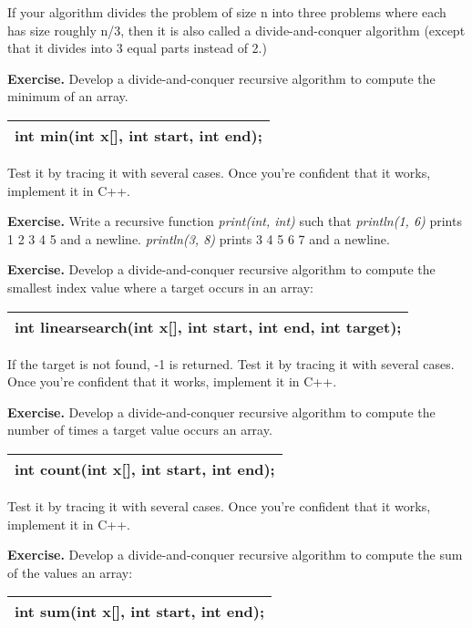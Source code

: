\documentclass[
]{article}
\begin{document}
If your algorithm divides the problem of size n into three problems
where each has size roughly n/3, then it is also called a
divide-and-conquer algorithm (except that it divides into 3 equal parts
instead of 2.)

\textbf{Exercise.} Develop a divide-and-conquer recursive algorithm to
compute the minimum of an array.

\begin{longtable}[]{@{}l@{}}
\toprule
\endhead
int min(int x{[}{]}, int start, int end);\tabularnewline
\bottomrule
\end{longtable}

Test it by tracing it with several cases. Once you're confident that it
works, implement it in C++.

\textbf{Exercise.} Write a recursive function \emph{print(int, int)}
such that \emph{println(1, 6)} prints 1 2 3 4 5 and a newline.
\emph{println(3, 8) }prints 3 4 5 6 7 and a newline.

\textbf{Exercise.} Develop a divide-and-conquer recursive algorithm to
compute the smallest index value where a target occurs in an array:

\begin{longtable}[]{@{}l@{}}
\toprule
\endhead
int linearsearch(int x{[}{]}, int start, int end, int
target);\tabularnewline
\bottomrule
\end{longtable}

If the target is not found, -1 is returned. Test it by tracing it with
several cases. Once you're confident that it works, implement it in C++.

\textbf{Exercise.} Develop a divide-and-conquer recursive algorithm to
compute the number of times a target value occurs an array.

\begin{longtable}[]{@{}l@{}}
\toprule
\endhead
int count(int x{[}{]}, int start, int end);\tabularnewline
\bottomrule
\end{longtable}

Test it by tracing it with several cases. Once you're confident that it
works, implement it in C++.

\textbf{Exercise.} Develop a divide-and-conquer recursive algorithm to
compute the sum of the values an array:

\begin{longtable}[]{@{}l@{}}
\toprule
\endhead
int sum(int x{[}{]}, int start, int end);\tabularnewline
\bottomrule
\end{longtable}
\end{document}
